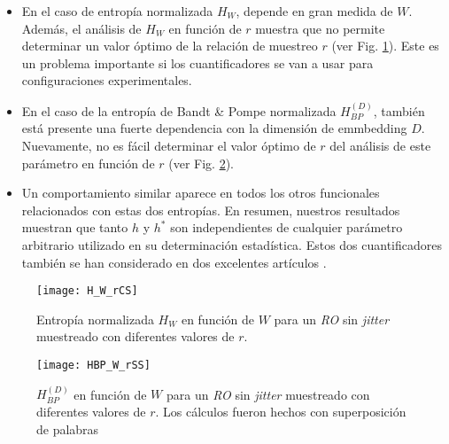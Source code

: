 \begin{itemize}
	\item En el caso de entropía normalizada $H_ {W}$, depende en gran medida de $W$.
	Además, el análisis de $H_{W}$ en función de $r$ muestra que no permite determinar un valor óptimo de la relación de muestreo $r$ (ver Fig. \ref{fig:H_W_rCS}).
	Este es un problema importante si los cuantificadores se van a usar para configuraciones experimentales.
	\item En el caso de la entropía de Bandt \& Pompe normalizada $H^{(D)}_{BP}$, también está presente una fuerte dependencia con la dimensión de emmbedding $D$.
	Nuevamente, no es fácil determinar el valor óptimo de $r$ del análisis de este parámetro en función de $r$ (ver Fig. \ref{fig:HBP_W_rSS}).
	\item Un comportamiento similar aparece en todos los otros funcionales relacionados con estas dos entropías.
	En resumen, nuestros resultados muestran que tanto $h$ y $h^*$ son independientes de cualquier parámetro arbitrario utilizado en su determinación estadística.
	Estos dos cuantificadores también se han considerado en dos excelentes artículos \cite{Amigo2006, Ebeling2001}.
\end{itemize}

%
\begin{figure}
\center
\texttt{[image: H\_W\_rCS]}
\caption{Entropía normalizada $H_W$ en función de $W$ para un \emph{RO} sin \textit{jitter} muestreado con diferentes valores de $r$.}
\label{fig:H_W_rCS}
\end{figure}
%
\begin{figure}
\center
\texttt{[image: HBP\_W\_rSS]}
\caption{$H^{(D)}_{BP}$ en función de  $W$ para un \emph{RO} sin \textit{jitter} muestreado con diferentes valores de $r$. Los cálculos fueron hechos con superposición de palabras}
\label{fig:HBP_W_rSS}
\end{figure}

